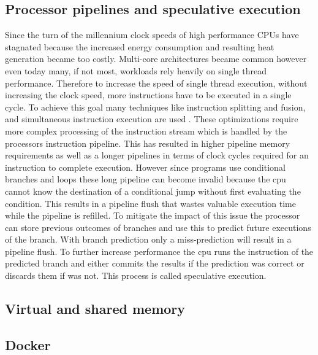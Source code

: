 \documentclass[conference,compsoc,final,a4paper]{IEEEtran}
\begin{document}
\subsection{Processor pipelines and speculative execution}
Since the turn of the millennium clock speeds of high performance CPUs have stagnated because the increased energy consumption and resulting heat generation became
too costly. \cite{fog2012microarchitecture} Multi-core architectures became common however even today many, if not most,
workloads rely heavily on single thread performance. Therefore to increase the speed of single thread execution, without increasing the clock speed,
more instructions have to be executed in a single cycle. To achieve this goal many techniques like instruction splitting and fusion,
and simultaneous instruction execution are used \cite{fog2012microarchitecture}. These optimizations require more complex processing of the instruction stream which
is handled by the processors instruction pipeline. This has resulted in higher pipeline memory requirements as well as a longer pipelines in terms of clock cycles
required for an instruction to complete execution. However since programs use conditional branches and loops these long pipeline can become invalid because the cpu
cannot know the destination of a conditional jump without first evaluating the condition. This results in a pipeline flush that wastes valuable execution time while
the pipeline is refilled. To mitigate the impact of this issue the processor can store previous outcomes of branches and use this to predict future executions of the
branch. With branch prediction only a miss-prediction will result in a pipeline flush. To further increase performance the cpu runs the instruction of
the predicted branch and either commits the results if the prediction was correct or discards them if was not.
This process is called speculative execution. \cite{kocher2018spectre}
\subsection{Virtual and shared memory}

\subsection{Docker}
\end{document}
